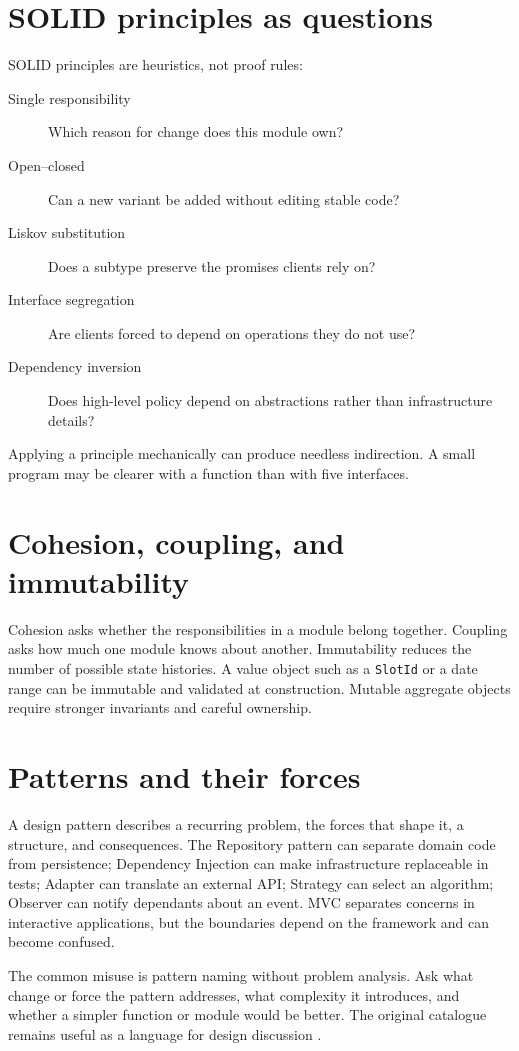 \section{SOLID principles as questions}
SOLID principles are heuristics, not proof rules:
\begin{description}
\item[Single responsibility] Which reason for change does this module own?
\item[Open--closed] Can a new variant be added without editing stable code?
\item[Liskov substitution] Does a subtype preserve the promises clients rely on?
\item[Interface segregation] Are clients forced to depend on operations they do not use?
\item[Dependency inversion] Does high-level policy depend on abstractions rather than infrastructure details?
\end{description}
Applying a principle mechanically can produce needless indirection. A small program may be clearer with a function than with five interfaces.

\section{Cohesion, coupling, and immutability}
Cohesion asks whether the responsibilities in a module belong together. Coupling asks how much one module knows about another. Immutability reduces the number of possible state histories. A value object such as a \texttt{SlotId} or a date range can be immutable and validated at construction. Mutable aggregate objects require stronger invariants and careful ownership.

\section{Patterns and their forces}
A design pattern describes a recurring problem, the forces that shape it, a structure, and consequences. The Repository pattern can separate domain code from persistence; Dependency Injection can make infrastructure replaceable in tests; Adapter can translate an external API; Strategy can select an algorithm; Observer can notify dependants about an event. MVC separates concerns in interactive applications, but the boundaries depend on the framework and can become confused.

The common misuse is pattern naming without problem analysis. Ask what change or force the pattern addresses, what complexity it introduces, and whether a simpler function or module would be better. The original catalogue remains useful as a language for design discussion \citep{gamma1994design}.

